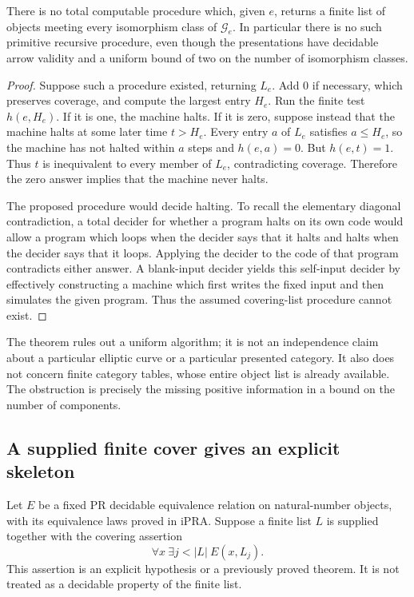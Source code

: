 \begin{theorem}
\label{thm:no-two-class-skeleton}
There is no total computable procedure which, given $e$, returns a
finite list of objects meeting every isomorphism class of
$\mathcal G_e$. In particular there is no such primitive recursive
procedure, even though the presentations have decidable arrow validity
and a uniform bound of two on the number of isomorphism classes.
\end{theorem}

\begin{proof}
Suppose such a procedure existed, returning $L_e$. Add $0$ if necessary,
which preserves coverage, and compute the largest entry $H_e$.
Run the finite test $h(e,H_e)$. If it is one, the machine halts.
If it is zero, suppose instead that the machine halts at some later
time $t>H_e$. Every entry $a$ of $L_e$ satisfies $a\leq H_e$, so the
machine has not halted within $a$ steps and $h(e,a)=0$. But
$h(e,t)=1$. Thus $t$ is inequivalent to every member of $L_e$,
contradicting coverage. Therefore the zero answer implies that the
machine never halts.

The proposed procedure would decide halting. To recall the elementary
diagonal contradiction, a total decider for whether a program halts on
its own code would allow a program which loops when the decider says
that it halts and halts when the decider says that it loops. Applying
the decider to the code of that program contradicts either answer.
A blank-input decider yields this self-input decider by effectively
constructing a machine which first writes the fixed input and then
simulates the given program. Thus the assumed covering-list procedure
cannot exist.
\end{proof}

The theorem rules out a uniform algorithm; it is not an independence
claim about a particular elliptic curve or a particular presented
category. It also does not concern finite category tables, whose entire
object list is already available. The obstruction is precisely the
missing positive information in a bound on the number of components.

\subsection{A supplied finite cover gives an explicit skeleton}

Let $E$ be a fixed PR decidable equivalence relation on natural-number
objects, with its equivalence laws proved in iPRA. Suppose a finite list
$L$ is supplied together with the covering assertion
\begin{equation}
            \forall x\ \exists j<|L|\ E(x,L_j).
\label{eq:groupoid-cover}
\end{equation}
This assertion is an explicit hypothesis or a previously proved
theorem. It is not treated as a decidable property of the finite list.

